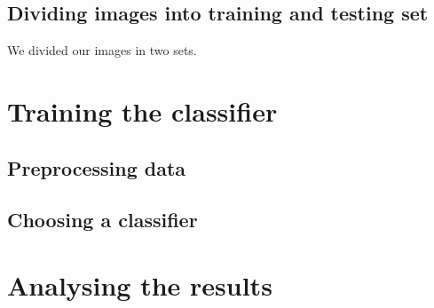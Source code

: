 \documentclass[12pt,a4paper]{article}
\begin{document}
    \subsection{Dividing images into training and testing set}

    We divided our images in two sets. %

    \section{Training the classifier}

    \subsection{Preprocessing data}


    \subsection{Choosing a classifier}


    \section{Analysing the results}

\end{document}
